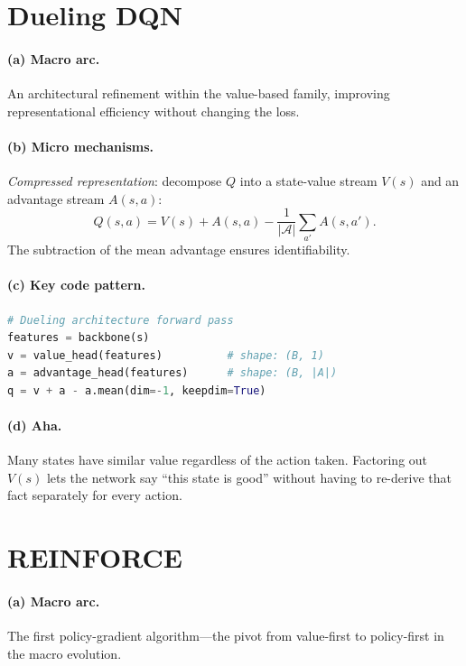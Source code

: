 \section{Dueling DQN}
\label{sec:dueling}

\paragraph{(a) Macro arc.}
An architectural refinement within the value-based family, improving representational efficiency without changing the loss.

\paragraph{(b) Micro mechanisms.}
\emph{Compressed representation}: decompose $Q$ into a state-value stream $V(s)$ and an advantage stream $A(s,a)$:
\[
  Q(s,a) = V(s) + A(s,a) - \frac{1}{|\mathcal{A}|}\sum_{a'} A(s,a').
\]
The subtraction of the mean advantage ensures identifiability.

\paragraph{(c) Key code pattern.}

\begin{lstlisting}[language=Python]
# Dueling architecture forward pass
features = backbone(s)
v = value_head(features)          # shape: (B, 1)
a = advantage_head(features)      # shape: (B, |A|)
q = v + a - a.mean(dim=-1, keepdim=True)
\end{lstlisting}

\paragraph{(d) Aha.}
Many states have similar value regardless of the action taken.
Factoring out $V(s)$ lets the network say ``this state is good'' without having to re-derive that fact separately for every action.

\section{REINFORCE}
\label{sec:reinforce}

\paragraph{(a) Macro arc.}
The first policy-gradient algorithm---the pivot from value-first to policy-first in the macro evolution.


